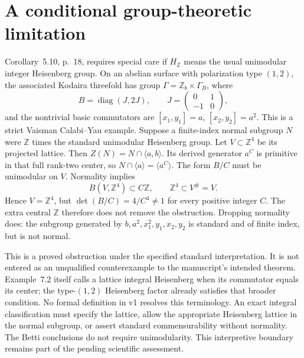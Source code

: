 \documentclass[10pt]{article}
\begin{document}
\section*{A conditional group-theoretic limitation}
Corollary 5.10, p. 18, requires special care if \(H_{\mathbb Z}\) means the usual unimodular integer Heisenberg group. On an abelian surface with polarization type \((1,2)\), the associated Kodaira threefold has group \(\Gamma=\mathbb Z_b\times\Gamma_B\), where \[B=\operatorname{diag}(J,2J),\qquad
 J=\begin{pmatrix}0&1\\-1&0\end{pmatrix},\] and the nontrivial basic commutators are \([x_1,y_1]=a\), \([x_2,y_2]=a^2\). This is a strict Vaisman Calabi–Yau example. Suppose a finite-index normal subgroup \(N\) were \(\mathbb Z\) times the standard unimodular Heisenberg group. Let \(V\subset\mathbb Z^4\) be its projected lattice. Then \(Z(N)=N\cap\langle a,b\rangle\). Its derived generator \(a^C\) is primitive in that full rank-two center, so \(N\cap\langle a\rangle=\langle a^C\rangle\). The form \(B/C\) must be unimodular on \(V\). Normality implies \[B(V,\mathbb Z^4)\subset C\mathbb Z,\qquad
 \mathbb Z^4\subset V^\#=V.\] Hence \(V=\mathbb Z^4\), but \(\det(B/C)=4/C^4\ne1\) for every positive integer \(C\). The extra central \(\mathbb Z\) therefore does not remove the obstruction. Dropping normality does: the subgroup generated by \(b,a^2,x_1^2,y_1,x_2,y_2\) is standard and of finite index, but is not normal.\par
This is a proved obstruction under the specified standard interpretation. It is not entered as an unqualified counterexample to the manuscript’s intended theorem. Example 7.2 itself calls a lattice integral Heisenberg when its commutator equals its center; the type-\((1,2)\) Heisenberg factor already satisfies that broader condition. No formal definition in v1 resolves this terminology. An exact integral classification must specify the lattice, allow the appropriate Heisenberg lattice in the normal subgroup, or assert standard commensurability without normality. The Betti conclusions do not require unimodularity. This interpretive boundary remains part of the pending scientific assessment.\par
\end{document}
